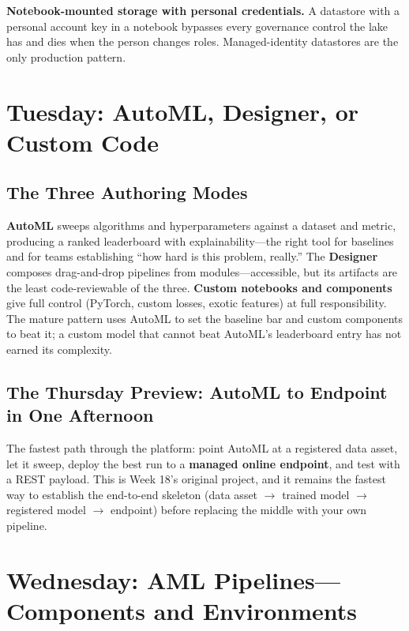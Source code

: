 \begin{pitfall}
\textbf{Notebook-mounted storage with personal credentials.} A datastore with a personal account key in a notebook bypasses every governance control the lake has and dies when the person changes roles. Managed-identity datastores are the only production pattern.
\end{pitfall}

\section{Tuesday: AutoML, Designer, or Custom Code}

\subsection{The Three Authoring Modes}
\textbf{AutoML} sweeps algorithms and hyperparameters against a dataset and metric, producing a ranked leaderboard with explainability---the right tool for baselines and for teams establishing ``how hard is this problem, really.'' The \textbf{Designer} composes drag-and-drop pipelines from modules---accessible, but its artifacts are the least code-reviewable of the three. \textbf{Custom notebooks and components} give full control (PyTorch, custom losses, exotic features) at full responsibility. The mature pattern uses AutoML to set the baseline bar and custom components to beat it; a custom model that cannot beat AutoML's leaderboard entry has not earned its complexity.

\subsection{The Thursday Preview: AutoML to Endpoint in One Afternoon}
The fastest path through the platform: point AutoML at a registered data asset, let it sweep, deploy the best run to a \textbf{managed online endpoint}, and test with a REST payload. This is Week 18's original project, and it remains the fastest way to establish the end-to-end skeleton (data asset $\rightarrow$ trained model $\rightarrow$ registered model $\rightarrow$ endpoint) before replacing the middle with your own pipeline.

\section{Wednesday: AML Pipelines---Components and Environments}

